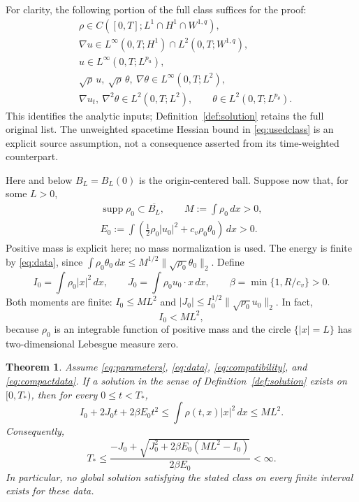 \documentclass[11pt,letterpaper]{article}
\numberwithin{equation}{section}
\newtheorem{theorem}{Theorem}[section]
\theoremstyle{definition}
\newcommand{\dd}{\,dx}
\newcommand{\supp}{\operatorname{supp}}
\newcommand{\norm}[2]{\lVert#1\rVert_{#2}}
\begin{document}
For clarity, the following portion of the full class suffices
for the proof:
\begin{equation}
 \begin{aligned}
 &\rho\in C([0,T];L^1\cap H^1\cap W^{1,q}),\\
 &\nabla u\in L^\infty(0,T;H^1)
                    \cap L^2(0,T;W^{1,q}),\\
 &u\in L^\infty(0,T;L^{p_u}),\\
 &\sqrt\rho\,u,\ \sqrt\rho\,\theta,\ \nabla\theta
                       \in L^\infty(0,T;L^2),\\
 &\nabla u_t,\ \nabla^2\theta\in L^2(0,T;L^2),\qquad
       \theta\in L^2(0,T;L^{p_\theta}).
 \end{aligned}\label{eq:usedclass}
\end{equation}
This identifies the analytic inputs; Definition~\ref{def:solution}
retains the full original list. The unweighted spacetime Hessian
bound in \eqref{eq:usedclass} is an explicit source assumption,
not a consequence asserted from its time-weighted counterpart.

Here and below $B_L=B_L(0)$ is the origin-centered ball. Suppose now that,
for some $L>0$,
\begin{equation}
 \begin{gathered}
 \supp\rho_0\subset\overline{B_L},\qquad M:=\int\rho_0\dd>0,\\
 E_0:=\int\left(\tfrac12\rho_0|u_0|^2+c_v\rho_0\theta_0\right)\dd>0.
 \end{gathered}
 \label{eq:compactdata}
\end{equation}
Positive mass is explicit here; no mass normalization is used.
The energy is finite by \eqref{eq:data}, since
$\int\rho_0\theta_0\dd
\le M^{1/2}\norm{\sqrt{\rho_0}\theta_0}{2}$.
Define
\begin{equation}
 I_0=\int\rho_0|x|^2\dd,\qquad
 J_0=\int\rho_0u_0\cdot x\dd,\qquad
 \beta=\min\{1,R/c_v\}>0.
 \label{eq:moments}
\end{equation}
Both moments are finite:
$I_0\le ML^2$ and
$|J_0|\le I_0^{1/2}\norm{\sqrt{\rho_0}u_0}{2}$. In fact,
\begin{equation}
 I_0<ML^2,
 \label{eq:strictmoment}
\end{equation}
because $\rho_0$ is an integrable function of positive mass and the
circle $\{|x|=L\}$ has two-dimensional Lebesgue measure zero.

\begin{theorem}\label{thm:obstruction}
Assume \eqref{eq:parameters}, \eqref{eq:data},
\eqref{eq:compatibility}, and \eqref{eq:compactdata}.
If a solution in the sense of Definition~\ref{def:solution} exists on
$[0,T_*)$, then for every $0\le t<T_*$,
\begin{equation}
 I_0+2J_0t+2\beta E_0t^2
       \le\int\rho(t,x)|x|^2\dd\le ML^2.
 \label{eq:mainbound}
\end{equation}
Consequently,
\begin{equation}
 T_*\le
 \frac{-J_0+\sqrt{J_0^2+2\beta E_0(ML^2-I_0)}}
      {2\beta E_0}<\infty.
 \label{eq:lifespan}
\end{equation}
In particular, no global solution satisfying the stated class on
every finite interval exists for these data.
\end{theorem}
\end{document}

